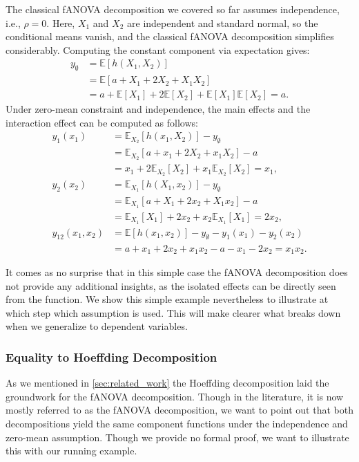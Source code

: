 The classical fANOVA decomposition we covered so far assumes independence, i.e., $\rho = 0$. 
Here, $X_1$ and $X_2$ are independent and standard normal, so the conditional means vanish, and the classical fANOVA decomposition simplifies considerably. 
Computing the constant component via expectation gives:
\begin{align*}
    y_{\emptyset} &= \mathbb{E}[h(X_1, X_2)] \\
    &= \mathbb{E}[a + X_1 + 2X_2 + X_1X_2] \\
    &= a + \mathbb{E}[X_1] + 2\mathbb{E}[X_2] + \mathbb{E}[X_1]\mathbb{E}[X_2] = a.
\end{align*}
Under zero-mean constraint and independence, the main effects and the interaction effect can be computed as follows:
\begin{align*}
y_1(x_1) &= \mathbb{E}_{X_2}[h(x_1, X_2)] - y_{\emptyset} \\
&= \mathbb{E}_{X_2}[a + x_1 + 2X_2 + x_1X_2] - a \\
&= x_1 + 2\mathbb{E}_{X_2}[X_2] + x_1\mathbb{E}_{X_2}[X_2] = x_1,\\
y_2(x_2) &= \mathbb{E}_{X_1}[h(X_1, x_2)] - y_{\emptyset} \\
&= \mathbb{E}_{X_1}[a + X_1 + 2x_2 + X_1x_2] - a \\
&= \mathbb{E}_{X_1}[X_1] + 2x_2 + x_2\mathbb{E}_{X_1}[X_1] = 2x_2,\\
y_{12}(x_1, x_2) &= \mathbb{E}[h(x_1, x_2)] - y_{\emptyset} - y_1(x_1) - y_2(x_2) \\
&= a + x_1 + 2x_2 + x_1x_2 - a - x_1 - 2x_2 = x_1x_2.
\end{align*}

It comes as no surprise that in this simple case the fANOVA decomposition does not provide any additional insights, as the isolated effects can be directly seen from the function.
We show this simple example nevertheless to illustrate at which step which assumption is used.
This will make clearer what breaks down when we generalize to dependent variables.

\subsubsection{Equality to Hoeffding Decomposition}
As we mentioned in \autoref{sec:related_work} the Hoeffding decomposition \citep{hoeffding1948} laid the groundwork for the fANOVA decomposition. Though in the literature, it is now mostly referred to as the fANOVA decomposition, we want to point out that both decompositions yield the same component functions under the independence and zero-mean assumption. Though we provide no formal proof, we want to illustrate this with our running example.


